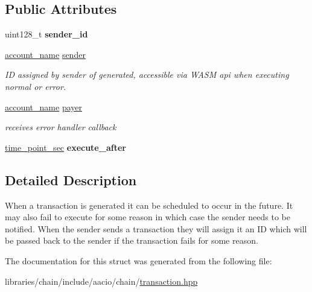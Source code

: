 \subsection*{Public Attributes}
\begin{DoxyCompactItemize}
\item 
\mbox{\label{structaacio_1_1chain_1_1deferred__transaction_a8b824ba1bbc29a31d1b17f5c4204e25f}} 
uint128\+\_\+t {\bfseries sender\+\_\+id}
\item 
\mbox{\label{structaacio_1_1chain_1_1deferred__transaction_a9f90d4dc7bf261b8450dd565f15fc82c}} 
\mbox{\hyperlink{structaacio_1_1chain_1_1name}{account\+\_\+name}} \mbox{\hyperlink{structaacio_1_1chain_1_1deferred__transaction_a9f90d4dc7bf261b8450dd565f15fc82c}{sender}}
\begin{DoxyCompactList}\small\item\em ID assigned by sender of generated, accessible via W\+A\+SM api when executing normal or error. \end{DoxyCompactList}\item 
\mbox{\label{structaacio_1_1chain_1_1deferred__transaction_a6c684aa768b05c5645bbef7e054cad8a}} 
\mbox{\hyperlink{structaacio_1_1chain_1_1name}{account\+\_\+name}} \mbox{\hyperlink{structaacio_1_1chain_1_1deferred__transaction_a6c684aa768b05c5645bbef7e054cad8a}{payer}}
\begin{DoxyCompactList}\small\item\em receives error handler callback \end{DoxyCompactList}\item 
\mbox{\label{structaacio_1_1chain_1_1deferred__transaction_ae1f61d9d54cc852f6cb5332eac486d23}} 
\mbox{\hyperlink{classfc_1_1time__point__sec}{time\+\_\+point\+\_\+sec}} {\bfseries execute\+\_\+after}
\end{DoxyCompactItemize}


\subsection{Detailed Description}
When a transaction is generated it can be scheduled to occur in the future. It may also fail to execute for some reason in which case the sender needs to be notified. When the sender sends a transaction they will assign it an ID which will be passed back to the sender if the transaction fails for some reason. 

The documentation for this struct was generated from the following file\+:\begin{DoxyCompactItemize}
\item 
libraries/chain/include/aacio/chain/\mbox{\hyperlink{libraries_2chain_2include_2aacio_2chain_2transaction_8hpp}{transaction.\+hpp}}\end{DoxyCompactItemize}
